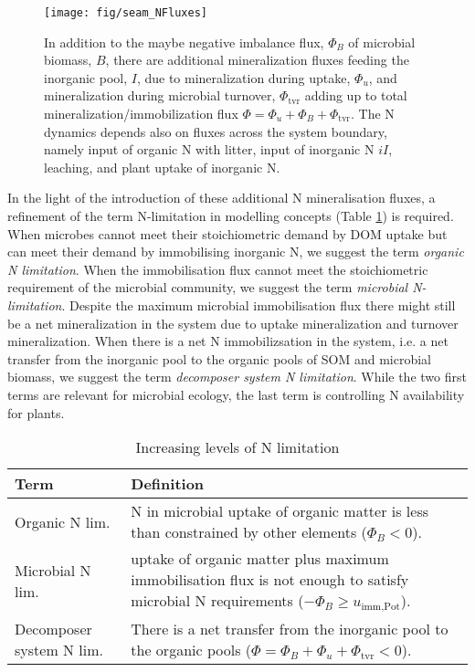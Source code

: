 \begin{figure}[t] \vspace*{2mm}
\begin{center}
\texttt{[image: fig/seam\_NFluxes]} 
\end{center}
\caption{
In addition to the maybe negative imbalance flux, $\Phi_B$ of microbial biomass,
$B$, there are additional mineralization fluxes feeding the inorganic pool, $I$,
due to mineralization during uptake, $\Phi_u$, and mineralization during
microbial turnover, $\Phi_{\operatorname{tvr}}$ adding up to total
mineralization/immobilization flux $\Phi = \Phi_u + \Phi_B +
\Phi_{\operatorname{tvr}}$.
The N dynamics depends also on fluxes across the system boundary, namely input of organic N with litter, input
of inorganic N $iI$, leaching, and plant uptake of inorganic N.
\label{fig:SEAMStructNFluxes}}
\end{figure}

In the light of the introduction of these additional N mineralisation fluxes, a
refinement of the term N-limitation in modelling concepts (Table
\ref{tab:NutrientLimDefs}) is required.
When microbes cannot meet their stoichiometric demand by DOM uptake but can
meet their demand by immobilising inorganic N, we suggest the term 
\textit{organic N limitation}.
When the immobilisation flux cannot meet the stoichiometric requirement of the
microbial community, we suggest the term \textit{microbial N-limitation}.
Despite the maximum microbial immobilisation flux there might still be a net
mineralization in the system due to uptake mineralization and turnover
mineralization. When there is a net N
immobilizsation in the system, i.e. a net transfer from the inorganic pool to
the organic pools of SOM and microbial biomass, we suggest the term 
\textit{decomposer system N limitation}. While the two first terms are relevant
for microbial ecology, the last term is controlling N availability for plants.

\begin{table}[t]
\caption{Increasing levels of N limitation \label{tab:NutrientLimDefs}}
\centering
\begin{tabular}{p{2.3cm}p{5.5cm}}
\hline
Term &  Definition \\
\hline
Organic N lim. & N in microbial uptake of organic matter is less than 
constrained by other elements (${\Phi_B < 0}$).
\\
Microbial N lim. & uptake of organic matter plus maximum immobilisation flux is
not enough to satisfy microbial N requirements (${-\Phi_B \ge
u_{\operatorname{imm,Pot}}}$).
\\
Decomposer system N lim. & There is a net transfer from the inorganic pool to
the organic pools (${\Phi = \Phi_B+\Phi_u+\Phi_{\operatorname{tvr}}<0}$).
\\
\hline
\end{tabular}
\end{table}
 
